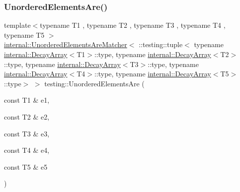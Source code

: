 \subsubsection{\texorpdfstring{Unordered\+Elements\+Are()}{UnorderedElementsAre()}\hspace{0.1cm}{\footnotesize\ttfamily [6/11]}}
{\footnotesize\ttfamily template$<$typename T1 , typename T2 , typename T3 , typename T4 , typename T5 $>$ \\
\hyperlink{classtesting_1_1internal_1_1_unordered_elements_are_matcher}{internal\+::\+Unordered\+Elements\+Are\+Matcher}$<$ \+::testing\+::tuple$<$ typename \hyperlink{structtesting_1_1internal_1_1_decay_array}{internal\+::\+Decay\+Array}$<$T1$>$\+::type, typename \hyperlink{structtesting_1_1internal_1_1_decay_array}{internal\+::\+Decay\+Array}$<$T2$>$\+::type, typename \hyperlink{structtesting_1_1internal_1_1_decay_array}{internal\+::\+Decay\+Array}$<$T3$>$\+::type, typename \hyperlink{structtesting_1_1internal_1_1_decay_array}{internal\+::\+Decay\+Array}$<$T4$>$\+::type, typename \hyperlink{structtesting_1_1internal_1_1_decay_array}{internal\+::\+Decay\+Array}$<$T5$>$\+::type$>$ $>$ testing\+::\+Unordered\+Elements\+Are (\begin{DoxyParamCaption}\item[{const T1 \&}]{e1,  }\item[{const T2 \&}]{e2,  }\item[{const T3 \&}]{e3,  }\item[{const T4 \&}]{e4,  }\item[{const T5 \&}]{e5 }\end{DoxyParamCaption})\hspace{0.3cm}{\ttfamily [inline]}}

\mbox{\label{namespacetesting_aff1859501ecd94dd1bc428d146a66fdc}} 

